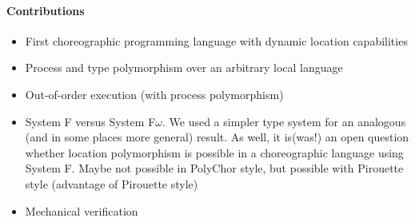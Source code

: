 \paragraph{Contributions}
\begin{itemize}
	\item First choreographic programming language with dynamic location capabilities
	\item Process and type polymorphism over an arbitrary local language
	\item Out-of-order execution (with process polymorphism)
	\item System F versus System F$\omega$. We used a simpler type system for an analogous (and in some places more general) result. As well, it is(was!) an open question whether location polymorphism is possible in a choreographic language using System F. Maybe not possible in PolyChor style, but possible with Pirouette style (advantage of Pirouette style)
	\item Mechanical verification
\end{itemize}


